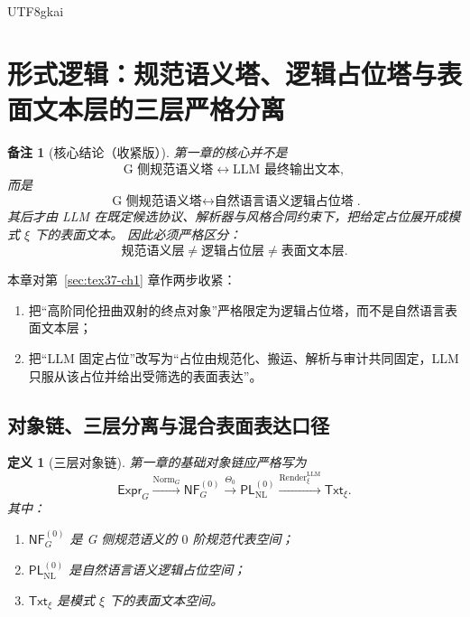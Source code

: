 \documentclass[12pt]{article}
\newtheorem{definition}{定义}[section]
\newtheorem{remark}{备注}[section]
\newcommand{\Norm}{\operatorname{Norm}}
\newcommand{\Render}{\operatorname{Render}}
\begin{document}
\begin{CJK*}{UTF8}{gkai}
\clearpage

\section{形式逻辑：规范语义塔、逻辑占位塔与表面文本层的三层严格分离}
\label{sec:tex37-ch3}

\begin{remark}[核心结论（收紧版）]
第一章的核心并不是
\[
  \text{G 侧规范语义塔}
  \leftrightarrow
  \text{LLM 最终输出文本},
\]
而是
\[
  \boxed{
    \text{G 侧规范语义塔}
    \leftrightarrow
    \text{自然语言语义逻辑占位塔}
  }.
\]
其后才由 LLM 在既定候选协议、解析器与风格合同约束下，把给定占位展开成模式 $\xi$ 下的表面文本。
因此必须严格区分：
\[
  \text{规范语义层}
  \neq
  \text{逻辑占位层}
  \neq
  \text{表面文本层}.
\]
\end{remark}

本章对第~\ref{sec:tex37-ch1} 章作两步收紧：
\begin{enumerate}
  \item 把“高阶同伦扭曲双射的终点对象”严格限定为逻辑占位塔，而不是自然语言表面文本层；
  \item 把“LLM 固定占位”改写为“占位由规范化、搬运、解析与审计共同固定，LLM 只服从该占位并给出受筛选的表面表达”。
\end{enumerate}

\subsection{对象链、三层分离与混合表面表达口径}
\label{subsec:tex37-ch3-objects}

\begin{definition}[三层对象链]
第一章的基础对象链应严格写为
\[
  \mathsf{Expr}_G
  \xrightarrow{\Norm_G}
  \mathsf{NF}_G^{(0)}
  \xrightarrow{\Theta_0}
  \mathsf{PL}_{\mathrm{NL}}^{(0)}
  \xrightarrow{\Render^{\mathrm{LLM}}_\xi}
  \mathsf{Txt}_\xi.
\]
其中：
\begin{enumerate}
  \item $\mathsf{NF}_G^{(0)}$ 是 G 侧规范语义的 $0$ 阶规范代表空间；
  \item $\mathsf{PL}_{\mathrm{NL}}^{(0)}$ 是自然语言语义逻辑占位空间；
  \item $\mathsf{Txt}_\xi$ 是模式 $\xi$ 下的表面文本空间。
\end{enumerate}
\end{definition}


\end{CJK*}
\end{document}
